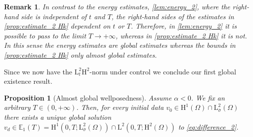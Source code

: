\documentclass[preprint]{elsarticle}
\newtheorem{prop}[prop]{Proposition}
\newtheorem{rem}[rem]{Remark}
\numberwithin{equation}{section}
\newcommand {\E}	{\mathbb{E}}
\renewcommand{\H}{\mathrm{H}}
\newcommand{\sigmabar}{\bar{\sigma}}
\renewcommand{\bar}[1]{\overline{#1}}
\newcommand{\rL}{\mathrm{L}}
\newcommand{\rH}{\H}
\begin{document}
\begin{rem}
	In contrast to the energy estimates, \autoref{lem:energy_2}, where the right-hand side is independent of $t$ and $T$, the right-hand sides of the estimates in \autoref{prop:estimate_2 Hk} dependent on $t$ or $T$. Therefore, in \autoref{lem:energy_2} it is possible to pass to the limit $T \to + \infty$, whereas in \autoref{prop:estimate_2 Hk} it is not. In this sense the energy estimates are global estimates whereas the bounds in \autoref{prop:estimate_2 Hk} only almost global estimates.
\end{rem}

Since we now have the $\rL^2_t\rH^2$-norm under control we conclude our first global existence result.

\begin{prop}[Almost global wellposedness]\label{prop:almost global_2}
	Assume $\alpha < 0$. %
	We fix an arbitrary $T \in (0,+\infty)$. 
	Then, for every initial data $v_0 \in \rH^1(\Omega)\cap \rL^2_{\sigmabar}(\Omega)$ there exists a unique global solution $v_d \in \E_1(T) =  \rH^{1}(0,T;\rL^2_{\sigmabar}(\Omega)) \cap \rL^{2}(0,T;\rH^{2}(\Omega))$ to \eqref{eq:difference_2}.	
\end{prop}
\end{document}
